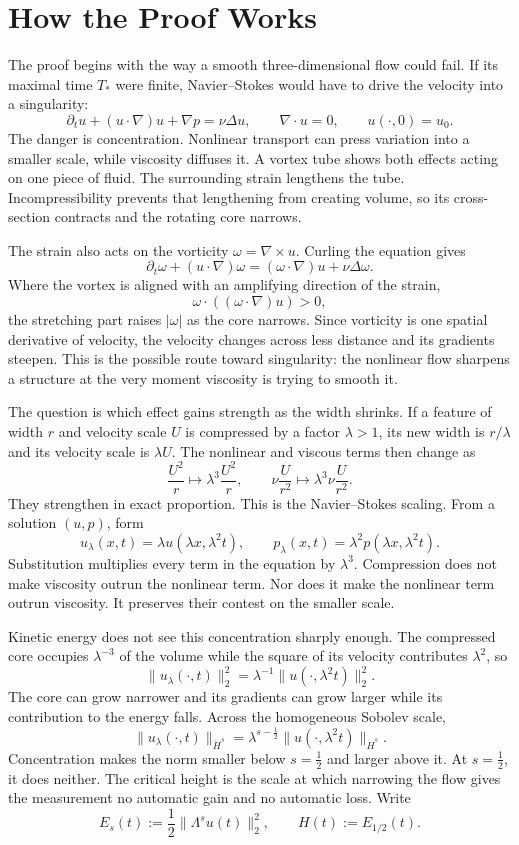 \documentclass[11pt]{article}
\begin{document}
\section*{How the Proof Works}

The proof begins with the way a smooth three-dimensional flow could fail. If its maximal time \(T_*\) were finite, Navier--Stokes would have to drive the velocity into a singularity:
\[
\partial_tu+(u\cdot\nabla)u+\nabla p=\nu\Delta u,
\qquad \nabla\cdot u=0,
\qquad u(\cdot,0)=u_0.
\]
The danger is concentration. Nonlinear transport can press variation into a smaller scale, while viscosity diffuses it. A vortex tube shows both effects acting on one piece of fluid. The surrounding strain lengthens the tube. Incompressibility prevents that lengthening from creating volume, so its cross-section contracts and the rotating core narrows.

The strain also acts on the vorticity \(\omega=\nabla\times u\). Curling the equation gives
\[
\partial_t\omega+(u\cdot\nabla)\omega
=(\omega\cdot\nabla)u+\nu\Delta\omega.
\]
Where the vortex is aligned with an amplifying direction of the strain,
\[
\omega\cdot((\omega\cdot\nabla)u)>0,
\]
the stretching part raises \(\lvert\omega\rvert\) as the core narrows. Since vorticity is one spatial derivative of velocity, the velocity changes across less distance and its gradients steepen. This is the possible route toward singularity: the nonlinear flow sharpens a structure at the very moment viscosity is trying to smooth it.

The question is which effect gains strength as the width shrinks. If a feature of width \(r\) and velocity scale \(U\) is compressed by a factor \(\lambda>1\), its new width is \(r/\lambda\) and its velocity scale is \(\lambda U\). The nonlinear and viscous terms then change as
\[
\frac{U^2}{r}
\longmapsto
\lambda^3\frac{U^2}{r},
\qquad
\nu\frac{U}{r^2}
\longmapsto
\lambda^3\nu\frac{U}{r^2}.
\]
They strengthen in exact proportion. This is the Navier--Stokes scaling. From a solution \((u,p)\), form
\[
u_\lambda(x,t)=\lambda u(\lambda x,\lambda^2t),
\qquad
p_\lambda(x,t)=\lambda^2p(\lambda x,\lambda^2t).
\]
Substitution multiplies every term in the equation by \(\lambda^3\). Compression does not make viscosity outrun the nonlinear term. Nor does it make the nonlinear term outrun viscosity. It preserves their contest on the smaller scale.

Kinetic energy does not see this concentration sharply enough. The compressed core occupies \(\lambda^{-3}\) of the volume while the square of its velocity contributes \(\lambda^2\), so
\[
\|u_\lambda(\cdot,t)\|_2^2
=\lambda^{-1}\|u(\cdot,\lambda^2t)\|_2^2.
\]
The core can grow narrower and its gradients can grow larger while its contribution to the energy falls. Across the homogeneous Sobolev scale,
\[
\|u_\lambda(\cdot,t)\|_{\dot H^s}
=\lambda^{s-\frac12}
\|u(\cdot,\lambda^2t)\|_{\dot H^s}.
\]
Concentration makes the norm smaller below \(s=\tfrac12\) and larger above it. At \(s=\tfrac12\), it does neither. The critical height is the scale at which narrowing the flow gives the measurement no automatic gain and no automatic loss. Write
\[
E_s(t):=\frac12\|\Lambda^su(t)\|_2^2,
\qquad
H(t):=E_{1/2}(t).
\]
\end{document}
